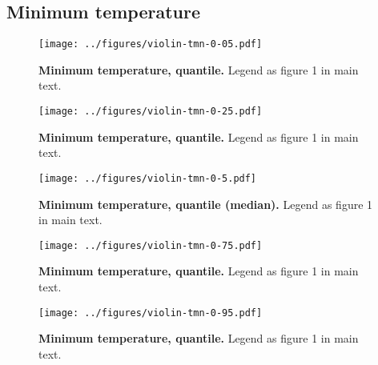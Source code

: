 \documentclass[12pt]{report}
\begin{document}
\subsection{Minimum temperature}
\begin{figure}[h!]
  \begin{center}
    \texttt{[image: ../figures/violin-tmn-0-05.pdf]}
  \end{center}
  \caption{\textbf{Minimum temperature,  quantile.} Legend as
    figure 1 in main text.}
\end{figure}
\begin{figure}[h!]
  \begin{center}
    \texttt{[image: ../figures/violin-tmn-0-25.pdf]}
  \end{center}
  \caption{\textbf{Minimum temperature,  quantile.} Legend as
    figure 1 in main text.}
\end{figure}
\begin{figure}[h!]
  \begin{center}
    \texttt{[image: ../figures/violin-tmn-0-5.pdf]}
  \end{center}
  \caption{\textbf{Minimum temperature,  quantile (median).}
    Legend as figure 1 in main text.}
\end{figure}
\begin{figure}[h!]
  \begin{center}
    \texttt{[image: ../figures/violin-tmn-0-75.pdf]}
  \end{center}
  \caption{\textbf{Minimum temperature,  quantile.} Legend as
    figure 1 in main text.}
\end{figure}
\begin{figure}[h!]
  \begin{center}
    \texttt{[image: ../figures/violin-tmn-0-95.pdf]}
  \end{center}
  \caption{\textbf{Minimum temperature,  quantile.} Legend as
    figure 1 in main text.}
\end{figure}

\clearpage
\end{document}
